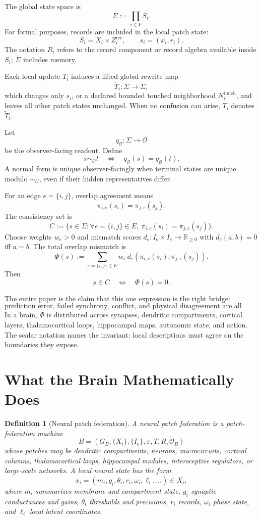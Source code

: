 \documentclass[11pt]{article}
\newtheorem{definition}[theorem]{Definition}
\theoremstyle{remark}
\theoremstyle{plain}
\newcommand{\R}{\mathbb R}
\newcommand{\rec}{\mathrm{rec}}
\begin{document}
The global state space is
\[
\Sigma:=\prod_{i\in V}S_i.
\]
For formal purposes, records are included in the local patch state:
\[
S_i=X_i\times Z_i^{\rec},
\qquad
s_i=(x_i,r_i).
\]
The notation \(R_i\) refers to the record component or record algebra available inside \(S_i\); \(\Sigma\) includes memory.

Each local update \(T_i\) induces a lifted global rewrite map
\[
\widetilde T_i:\Sigma\to\Sigma,
\]
which changes only \(s_i\), or a declared bounded touched neighborhood \(N_i^{\mathrm{touch}}\), and leaves all other patch states unchanged. When no confusion can arise, \(T_i\) denotes \(\widetilde T_i\).

Let
\[
q_{\mathcal O}:\Sigma\to\mathcal O
\]
be the observer-facing readout. Define
\[
s\sim_{\mathcal O}t
\quad\Longleftrightarrow\quad
q_{\mathcal O}(s)=q_{\mathcal O}(t).
\]
A normal form is unique observer-facingly when terminal states are unique modulo \(\sim_{\mathcal O}\), even if their hidden representatives differ.

For an edge \(e=\{i,j\}\), overlap agreement means
\[
\pi_{i,e}(s_i)=\pi_{j,e}(s_j).
\]
The consistency set is
\[
C:=\bigl\{s\in\Sigma:\forall e=\{i,j\}\in E,\ 
\pi_{i,e}(s_i)=\pi_{j,e}(s_j)\bigr\}.
\]
Choose weights \(w_e>0\) and mismatch scores \(d_e:I_e\times I_e\to\R_{\ge 0}\) with \(d_e(a,b)=0\) iff \(a=b\). The total overlap mismatch is
\[
\Phi(s)
:=
\sum_{e=\{i,j\}\in E}
w_e\,d_e\!\left(\pi_{i,e}(s_i),\pi_{j,e}(s_j)\right).
\]
Then
\[
s\in C\quad\Longleftrightarrow\quad \Phi(s)=0.
\]

The entire paper is the claim that this one expression is the right bridge:
\[
\boxed{
\text{prediction error, failed synchrony, conflict, and physical disagreement are all overlap mismatch.}
}
\]
In a brain, \(\Phi\) is distributed across synapses, dendritic compartments, cortical layers, thalamocortical loops, hippocampal maps, autonomic state, and action. The scalar notation names the invariant: local descriptions must agree on the boundaries they expose.

\section{What the Brain Mathematically Does}

\begin{definition}[Neural patch federation]
A neural patch federation is a patch-federation machine
\[
B=(G_B,\{X_i\},\{I_e\},\pi,T,R,\mathcal O_B)
\]
whose patches may be dendritic compartments, neurons, microcircuits, cortical columns, thalamocortical loops, hippocampal modules, interoceptive regulators, or large-scale networks. A local neural state has the form
\[
x_i=(m_i,g_i,\theta_i,r_i,\omega_i,\ell_i,\ldots)\in X_i,
\]
where \(m_i\) summarizes membrane and compartment state, \(g_i\) synaptic conductances and gains, \(\theta_i\) thresholds and precisions, \(r_i\) records, \(\omega_i\) phase state, and \(\ell_i\) local latent coordinates.
\end{definition}
\end{document}

